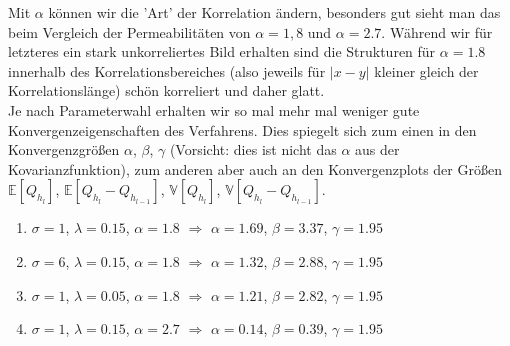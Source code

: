 \begin{figure}[H]
	\centering
\end{figure}
Mit $\alpha$ können wir die 'Art' der Korrelation ändern, besonders gut sieht man das beim Vergleich der Permeabilitäten von $\alpha = 1,8$ und $\alpha = 2.7$. Während wir für letzteres ein stark unkorreliertes Bild erhalten sind die Strukturen für $\alpha = 1.8$ innerhalb des Korrelationsbereiches (also jeweils für $| x-y|$ kleiner gleich der Korrelationslänge) schön korreliert und daher glatt. \\
Je nach Parameterwahl erhalten wir so mal mehr mal weniger gute Konvergenzeigenschaften des Verfahrens. Dies spiegelt sich zum einen in den Konvergenzgrößen $\alpha$, $ \beta$, $\gamma$ (Vorsicht: dies ist  nicht das $\alpha$ aus der Kovarianzfunktion), zum anderen aber auch an den Konvergenzplots der Größen $\mathbb{E}[Q_{h_l}]$,  $\mathbb{E}[Q_{h_l} - Q_{h_{l-1}}]$, $\mathbb{V}[Q_{h_l}]$,  $\mathbb{V}[Q_{h_l} - Q_{h_{l-1}}]$.
\begin{enumerate}
	\item $\sigma = 1$, $\lambda = 0.15$, $\alpha= 1.8$ $\Rightarrow$ $\alpha = 1.69$, $\beta = 3.37$, $\gamma = 1.95$
	\item $\sigma = 6$, $\lambda = 0.15$, $\alpha= 1.8$ $\Rightarrow$ $\alpha = 1.32$, $\beta = 2.88$, $\gamma = 1.95$
	\item $\sigma = 1$, $\lambda = 0.05$, $\alpha= 1.8$ $\Rightarrow$ $\alpha = 1.21$, $\beta = 2.82$, $\gamma = 1.95$
	\item $\sigma = 1$, $\lambda = 0.15$, $\alpha= 2.7$ $\Rightarrow$ $\alpha = 0.14$, $\beta = 0.39$, $\gamma = 1.95$
\end{enumerate}

